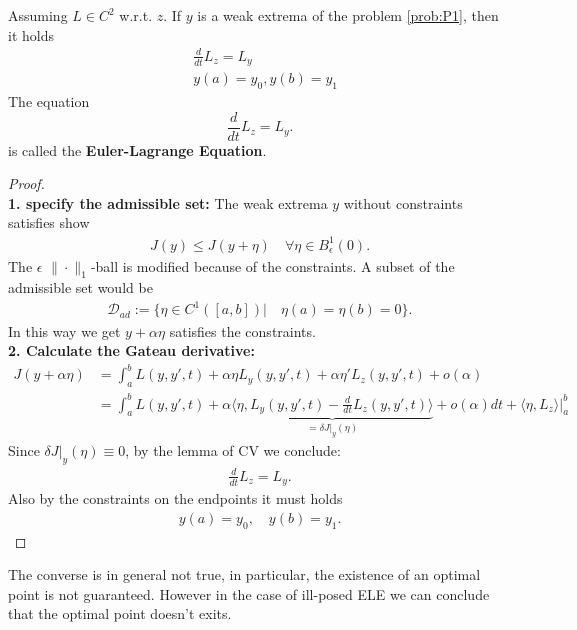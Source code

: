 \begin{theorem}
	Assuming $L \in C^2$ w.r.t. $z$.  If $y$ is a weak extrema of the problem \eqref{prob:P1}, then it holds
	\begin{equation}
	\begin{aligned}
		& \frac{d}{dt}L_{z} = L_y\\
		& y(a) = y_0, y(b) = y_1
	\end{aligned}
	\end{equation}
	The equation
	\begin{equation}
		\frac{d}{dt}L_z = L_y. 
	\end{equation}
	is called the \textbf{Euler-Lagrange Equation}.
\end{theorem}
\begin{proof}\quad\\
\textbf{1. specify the admissible set:} The weak extrema $y$ without constraints satisfies show 
\begin{align*}
	J(y) \le J(y + \eta) \quad \forall \eta \in B^1_\epsilon(0). 
\end{align*}
The $\epsilon$ $\|\cdot\|_1$-ball is modified because of the constraints. A subset of the admissible set would be
\begin{align*}
	\mathcal{D}_{ad}:= \{ \eta \in C^1([a, b])| \quad \eta(a) = \eta(b) = 0 \}.
\end{align*} 
In this way we get $y + \alpha \eta$ satisfies the constraints. 
\quad\\
\textbf{2. Calculate the Gateau derivative:}
	\begin{align*}
		J(y + \alpha \eta) &= \int_a^b L(y, y', t) + 
		 \alpha \eta  L_y(y, y', t) + \alpha \eta' L_z(y, y', t)
		 + o(\alpha)  \\
		& = \int_a^b L(y, y', t) + \alpha \underbrace{ \langle \eta, L_y(y, y', t) - \frac{d}{dt} L_{z}(y, y', t) \rangle}_{ = \delta J|_y(\eta)} + o(\alpha) dt + \langle \eta, L_z \rangle|_a^b   
	\end{align*}
Since $\delta J|_y(\eta) \equiv 0$, by the lemma of CV we conclude:
\begin{align*}
	\frac{d}{dt} L_z = L_y. 
\end{align*}
Also by the constraints on the endpoints it must holds
\begin{align*}
	y(a) = y_0, \quad y(b) = y_1. 
\end{align*}
\end{proof}

The converse is in general not true, in particular, the existence of an optimal point is not guaranteed. However in the case of ill-posed ELE we can conclude that the optimal point doesn't exits. 

